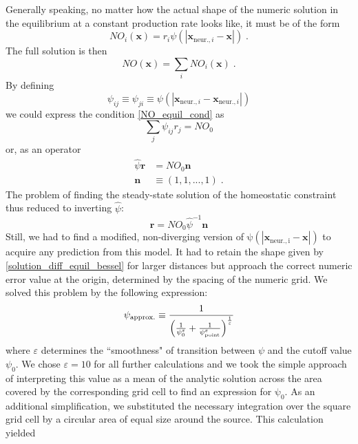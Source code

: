 \documentclass[10pt,a4paper]{article}
\begin{document}
Generally speaking, no matter how the actual shape of the numeric solution in the equilibrium at a constant production rate looks like, it must be of the form
\begin{equation}
NO_i(\mathbf{x}) = r_i \psi (|\mathbf{x}_{\mathrm{ neur.},i}-\mathbf{x}|) \; . \label{general_diff_interaction}
\end{equation}
The full solution is then
\begin{equation}
NO(\mathbf{x}) = \sum_i NO_i(\mathbf{x})\;.
\label{full_sol_diff_equil}
\end{equation}
By defining
\begin{equation}
\psi_{ij} \equiv \psi_{ji} \equiv \psi (|\mathbf{x}_{\mathrm{ neur.},i}-\mathbf{x}_{\mathrm{ neur.},i}|)
\label{interact_matrix_elements}
\end{equation}
we could express the condition \eqref{NO_equil_cond} as
\begin{equation}
\sum_j \psi_{ij} r_j = NO_0
\label{NO_equil_cond_interact_matrix}
\end{equation}
or, as an operator
\begin{align}
\hat{\psi}\mathbf{r} &= NO_0 \mathbf{n} \label{NO_equil_cond_interact_matrix_operator} \\
\mathbf{n}&\equiv (1,1,...,1) \; .
\end{align}
The problem of finding the steady-state solution of the homeostatic constraint thus reduced to inverting $\hat{\psi}$:
\begin{equation}
\mathbf{r} = NO_0 \hat{\psi}^{-1} \mathbf{n}
\label{NO_euqil_cond_interact_matrix_operator_solve}
\end{equation}
Still, we had to find a modified, non-diverging version of $\mathrm{\psi (|\mathbf{x}_{\mathrm{ neur.},i}-\mathbf{x}|)}$ to acquire any prediction from this model. It had to retain the shape given by \eqref{solution_diff_equil_bessel} for larger distances but approach the correct numeric error value at the origin, determined by the spacing of the numeric grid. We solved this problem by the following expression:
\begin{equation}
\psi_{\rm approx.} \equiv \frac{1}{\left(\frac{1}{\psi_0^\varepsilon} + \frac{1}{\psi_{\rm point}^\varepsilon}\right)^{\frac{1}{\varepsilon}}}
\label{Numeric_Solution_Expression_Trick}
\end{equation}
where $\varepsilon$ determines the ``smoothness" of transition between $\psi$ and the cutoff value $\psi_0$. We chose $\varepsilon=10$ for all further calculations and we took the simple approach of interpreting this value as a mean of the analytic solution across the area covered by the corresponding grid cell to find an expression for $\mathrm{\psi_0}$. As an additional simplification, we substituted the necessary integration over the square grid cell by a circular area of equal size around the source. This calculation yielded
\end{document}
